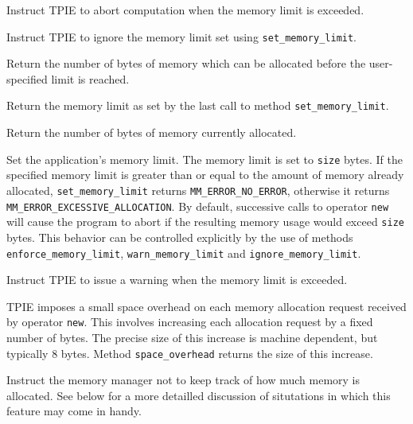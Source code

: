      {Instruct TPIE to
    abort computation when the memory limit is exceeded.}

     {Instruct TPIE to
    ignore the memory limit set using \lstinline|set_memory_limit|.}

     {Return the number of
    bytes of memory which can be allocated before the user-specified limit
    is reached.}

  \etabb
  
  \btabb
     {Return the memory limit as
    set by the last call to method \lstinline|set_memory_limit|.}

     {Return the number of bytes
    of memory currently allocated.}

     {Set the
    application's memory limit. The memory limit is set to \lstinline|size|
    bytes. If the specified memory limit is greater than or equal to the
    amount of memory already allocated, \lstinline|set_memory_limit| returns
    \lstinline|MM_ERROR_NO_ERROR|, otherwise it returns
    \lstinline|MM_ERROR_EXCESSIVE_ALLOCATION|. By default, successive calls
    to operator \lstinline|new| will cause the program to abort if the
    resulting memory usage would exceed \lstinline|size| bytes. This behavior
    can be controlled explicitly by the use of methods
    \lstinline|enforce_memory_limit|, \lstinline|warn_memory_limit| and
    \lstinline|ignore_memory_limit|.}

     {Instruct TPIE to
    issue a warning when the memory limit is exceeded.}

     {TPIE imposes a small space
    overhead on each memory allocation request received by operator
    \lstinline|new|. This involves increasing each allocation request by a
    fixed number of bytes. The precise size of this increase is machine
    dependent, but typically 8 bytes. Method \lstinline|space_overhead|
    returns the size of this increase.}

   {Instruct the
    memory manager not to keep track of how much memory is allocated.
    See below for a more detailled discussion of situtations in which
    this feature may come in handy.}
  
